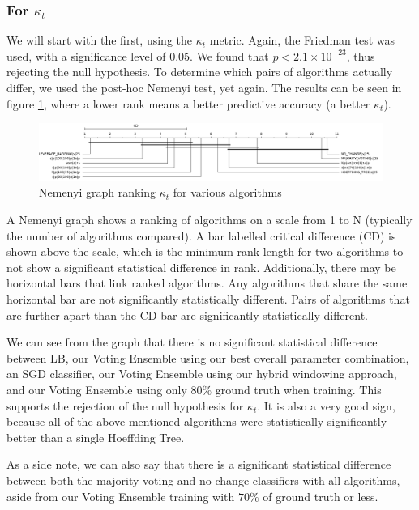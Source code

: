 \subsubsection{For $\kappa_t$}

We will start with the first, using the $\kappa_t$ metric. Again, the Friedman test was used, with a significance level of 0.05. We found that $p < 2.1\times10^{-23}$, thus rejecting the null hypothesis.
To determine which pairs of algorithms actually differ, we used the post-hoc Nemenyi test, yet again. The results can be seen in figure \ref{fig:sota_compare_all_kappa_nemenyi}, where a lower rank means a better predictive accuracy (a better $\kappa_t$).

\begin{figure}
  \includegraphics[width=\linewidth]{./images/chapter5/sota_compare_all_kappa_nemenyi}
\caption{\label{fig:sota_compare_all_kappa_nemenyi}Nemenyi graph ranking $\kappa_t$ for various algorithms}
\end{figure}

A Nemenyi graph shows a ranking of algorithms on a scale from 1 to N (typically the number of algorithms compared). A bar labelled critical difference (CD) is shown above the scale, which is the minimum rank length for two algorithms to not show a significant statistical difference in rank. 
Additionally, there may be horizontal bars that link ranked algorithms. Any algorithms that share the same horizontal bar are not significantly statistically different. Pairs of algorithms that are further apart than the CD bar are significantly statistically different.

We can see from the graph that there is no significant statistical difference between LB, our Voting Ensemble using our best overall parameter combination, an SGD classifier, our Voting Ensemble using our hybrid windowing approach, and our Voting Ensemble using only $80\%$ ground truth when training. This supports the rejection of the null hypothesis for $\kappa_t$. It is also a very good sign, because all of the above-mentioned algorithms were statistically significantly better than a single Hoeffding Tree.

As a side note, we can also say that there is a significant statistical difference between both the majority voting and no change classifiers with all algorithms, aside from our Voting Ensemble training with $70\%$ of ground truth or less.

